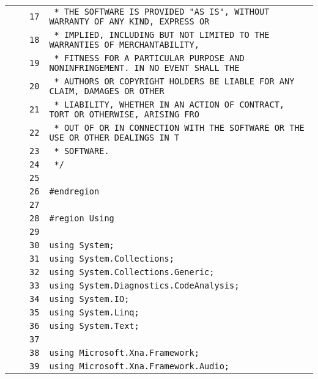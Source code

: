 \documentclass[a4paper,10pt]{article}
\begin{document}
\begin{longtable}[l]{lrrl}
\cellcolor{gray} &  & \verb~17~ & \verb~ * THE SOFTWARE IS PROVIDED "AS IS", WITHOUT WARRANTY OF ANY KIND, EXPRESS OR~\\
\cellcolor{gray} &  & \verb~18~ & \verb~ * IMPLIED, INCLUDING BUT NOT LIMITED TO THE WARRANTIES OF MERCHANTABILITY,~\\
\cellcolor{gray} &  & \verb~19~ & \verb~ * FITNESS FOR A PARTICULAR PURPOSE AND NONINFRINGEMENT. IN NO EVENT SHALL THE~\\
\cellcolor{gray} &  & \verb~20~ & \verb~ * AUTHORS OR COPYRIGHT HOLDERS BE LIABLE FOR ANY CLAIM, DAMAGES OR OTHER~\\
\cellcolor{gray} &  & \verb~21~ & \verb~ * LIABILITY, WHETHER IN AN ACTION OF CONTRACT, TORT OR OTHERWISE, ARISING FRO~\\
\cellcolor{gray} &  & \verb~22~ & \verb~ * OUT OF OR IN CONNECTION WITH THE SOFTWARE OR THE USE OR OTHER DEALINGS IN T~\\
\cellcolor{gray} &  & \verb~23~ & \verb~ * SOFTWARE.~\\
\cellcolor{gray} &  & \verb~24~ & \verb~ */~\\
\cellcolor{gray} &  & \verb~25~ & \verb~~\\
\cellcolor{gray} &  & \verb~26~ & \verb~#endregion~\\
\cellcolor{gray} &  & \verb~27~ & \verb~~\\
\cellcolor{gray} &  & \verb~28~ & \verb~#region Using~\\
\cellcolor{gray} &  & \verb~29~ & \verb~~\\
\cellcolor{gray} &  & \verb~30~ & \verb~using System;~\\
\cellcolor{gray} &  & \verb~31~ & \verb~using System.Collections;~\\
\cellcolor{gray} &  & \verb~32~ & \verb~using System.Collections.Generic;~\\
\cellcolor{gray} &  & \verb~33~ & \verb~using System.Diagnostics.CodeAnalysis;~\\
\cellcolor{gray} &  & \verb~34~ & \verb~using System.IO;~\\
\cellcolor{gray} &  & \verb~35~ & \verb~using System.Linq;~\\
\cellcolor{gray} &  & \verb~36~ & \verb~using System.Text;~\\
\cellcolor{gray} &  & \verb~37~ & \verb~~\\
\cellcolor{gray} &  & \verb~38~ & \verb~using Microsoft.Xna.Framework;~\\
\cellcolor{gray} &  & \verb~39~ & \verb~using Microsoft.Xna.Framework.Audio;~\\

\end{longtable}
\end{document}
